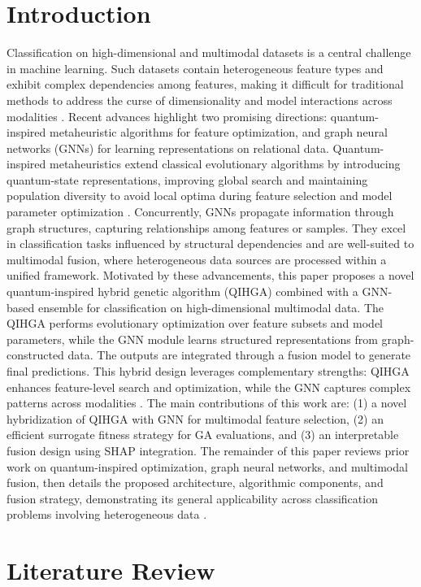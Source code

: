\documentclass[11pt,a4paper]{article}
\begin{document}
\section{Introduction}
Classification on high-dimensional and multimodal datasets is a central challenge in machine learning. Such datasets contain heterogeneous feature types and exhibit complex dependencies among features, making it difficult for traditional methods to address the curse of dimensionality and model interactions across modalities \citep{ref1}. Recent advances highlight two promising directions: quantum-inspired metaheuristic algorithms for feature optimization, and graph neural networks (GNNs) for learning representations on relational data. Quantum-inspired metaheuristics extend classical evolutionary algorithms by introducing quantum-state representations, improving global search and maintaining population diversity to avoid local optima during feature selection and model parameter optimization \citep{ref2}. Concurrently, GNNs propagate information through graph structures, capturing relationships among features or samples. They excel in classification tasks influenced by structural dependencies and are well-suited to multimodal fusion, where heterogeneous data sources are processed within a unified framework. Motivated by these advancements, this paper proposes a novel quantum-inspired hybrid genetic algorithm (QIHGA) combined with a GNN-based ensemble for classification on high-dimensional multimodal data. The QIHGA performs evolutionary optimization over feature subsets and model parameters, while the GNN module learns structured representations from graph-constructed data. The outputs are integrated through a fusion model to generate final predictions. This hybrid design leverages complementary strengths: QIHGA enhances feature-level search and optimization, while the GNN captures complex patterns across modalities \citep{ref3}. The main contributions of this work are: (1) a novel hybridization of QIHGA with GNN for multimodal feature selection, (2) an efficient surrogate fitness strategy for GA evaluations, and (3) an interpretable fusion design using SHAP integration. The remainder of this paper reviews prior work on quantum-inspired optimization, graph neural networks, and multimodal fusion, then details the proposed architecture, algorithmic components, and fusion strategy, demonstrating its general applicability across classification problems involving heterogeneous data \citep{ref4}.

\section{Literature Review}
\end{document}
